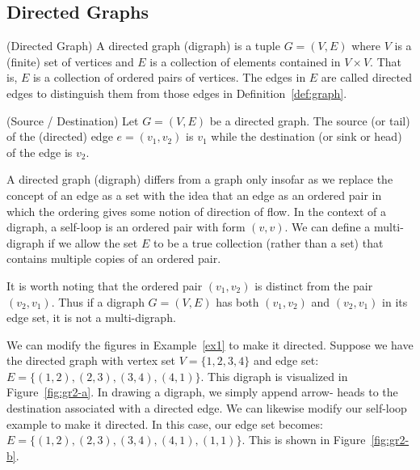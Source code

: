 \subsection{Directed Graphs}
%
\begin{definition}{(Directed Graph)}
A directed graph (digraph) is a tuple \(G = (V,E)\) where \(V\) is a (finite) set of vertices and \(E\) is a collection of elements contained in \(V \times V\).
That is, \(E\) is a collection of ordered pairs of vertices.
The edges in \(E\) are called directed edges to distinguish them from those edges in Definition~\ref{def:graph}.
\end{definition}
%
\begin{definition}{(Source / Destination)}
Let \(G = (V,E)\) be a directed graph.
The source (or tail) of the (directed) edge \(e = (v_1,v_2)\) is \(v_1\) while the destination (or sink or head) of the edge is \(v_2\).
\end{definition}
%
\begin{remark}
A directed graph (digraph) differs from a graph only insofar as we replace the concept of an edge as a set with the idea that an edge as an ordered pair in which the ordering gives some notion of direction of flow.
In the context of a digraph, a self-loop is an ordered pair with form \((v,v)\).
We can define a multi-digraph if we allow the set \(E\) to be a true collection (rather than a set) that contains multiple copies of an ordered pair.
\end{remark}
%
\begin{remark}
It is worth noting that the ordered pair \((v_1,v_2)\) is distinct from the pair \((v_2, v_1)\).
Thus if a digraph \(G = (V, E)\) has both \((v_1, v_2)\) and \((v_2, v_1)\) in its edge set, it is not a multi-digraph.
\end{remark}
%
\begin{example}
We can modify the figures in Example~\ref{ex1} to make it directed.
Suppose we have the directed graph with vertex set \(V = \{1, 2, 3, 4\}\) and edge set: \(E = \{(1, 2),\allowbreak (2, 3),\allowbreak (3, 4),\allowbreak (4, 1)\}\).
This digraph is visualized in Figure~\ref{fig:gr2-a}.
In drawing a digraph, we simply append arrow- heads to the destination associated with a directed edge.
We can likewise modify our self-loop example to make it directed.
In this case, our edge set becomes: \(E = \{(1, 2),\allowbreak (2, 3),\allowbreak (3, 4),\allowbreak (4, 1),\allowbreak (1, 1)\}\).
This is shown in Figure~\ref{fig:gr2-b}.
\end{example}
